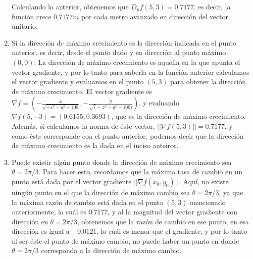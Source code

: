 \documentclass[12pt, letterpaper]{report}
\begin{document}
\begin{enumerate}
Calculando lo anterior, obtenemos que $D_uf(5, 3) = 0.7177$, es decir, la función crece $0.7177m$ por cada metro avanzado en dirección del vector unitario. 
\item Si la dirección de máximo crecimiento es la dirección indicada en el punto anterior, es decir, desde 
el punto dado y en dirección al punto máximo $(0, 0)$: La dirección de máximo crecimiento es aquella en la que apunta el vector gradiente, y por lo tanto para saberla en la función anterior calculamos el vector gradiente 
y evaluamos en el punto $(5, 3)$ para obtener la dirección de máximo crecimiento. El vector gradiente es $\nabla f = (-\frac{x}{\sqrt{-x^2 - y^2 + 100}}, -\frac{y}{\sqrt(-x^2 - y^2 + 100)})$, y evaluando $\nabla f(5, -3) = (0.6155, 0.3693)$, que es la 
dirección de máximo crecimiento. Además, si calculamos la norma de éste vector, $||\nabla f(5, 3)|| = 0.7177$, y como éste corresponde 
con el punto anterior, podemos decir que la dirección de máximo crecimiento es la dada en el inciso anteiror. 
\item Puede existir algún punto donde la dirección de máximo crecimiento sea $\theta = 2\pi / 3$. Para hacer esto, recordamos que la máxima tasa de cambio en un punto está dada por el vector gradiente $||\nabla f(x_0, y_0)||$. Aquí, no existe 
ningún punto en el que la dirección de máximo cambio sea $\theta = 2\pi / 3$, ya que la máxima razón de cambio está dada en el punto $(5, 3)$ mencionado anteriormente, la cuál es 0.7177, y al la magnitud del vector gradiente con dirección en 
$\theta = 2\pi / 3$, obtenemos que la razón de cambio en ese punto, en esa dirección es igual a $-0.0121$, lo cuál es menor que el gradiente, y por lo tanto al ser éste el punto de máximo cambio, 
no puede haber un punto en donde $\theta = 2\pi / 3$ corresponda a la dirección de máximo cambio. 
\end{enumerate}
\end{document}
